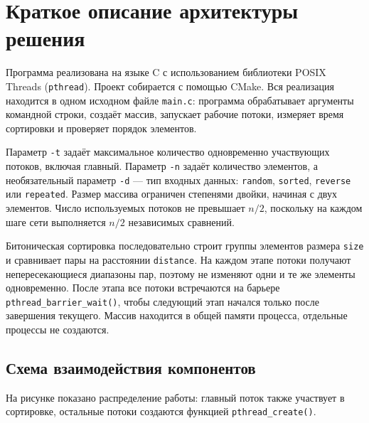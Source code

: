\documentclass[12pt,a4paper]{article}
\begin{document}
\section{Краткое описание архитектуры решения}
Программа реализована на языке C с использованием библиотеки POSIX Threads (\texttt{pthread}). Проект собирается с помощью CMake. Вся реализация находится в одном исходном файле \texttt{main.c}: программа обрабатывает аргументы командной строки, создаёт массив, запускает рабочие потоки, измеряет время сортировки и проверяет порядок элементов.

Параметр \texttt{-t} задаёт максимальное количество одновременно участвующих потоков, включая главный. Параметр \texttt{-n} задаёт количество элементов, а необязательный параметр \texttt{-d} --- тип входных данных: \texttt{random}, \texttt{sorted}, \texttt{reverse} или \texttt{repeated}. Размер массива ограничен степенями двойки, начиная с двух элементов. Число используемых потоков не превышает $n/2$, поскольку на каждом шаге сети выполняется $n/2$ независимых сравнений.

Битоническая сортировка последовательно строит группы элементов размера \texttt{size} и сравнивает пары на расстоянии \texttt{distance}. На каждом этапе потоки получают непересекающиеся диапазоны пар, поэтому не изменяют одни и те же элементы одновременно. После этапа все потоки встречаются на барьере \texttt{pthread\_barrier\_wait()}, чтобы следующий этап начался только после завершения текущего. Массив находится в общей памяти процесса, отдельные процессы не создаются.

\clearpage
\subsection{Схема взаимодействия компонентов}
На рисунке показано распределение работы: главный поток также участвует в сортировке, остальные потоки создаются функцией \texttt{pthread\_create()}.
\end{document}
